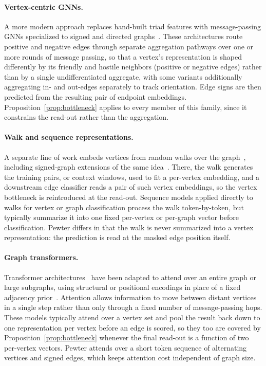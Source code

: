 \documentclass[sigconf]{acmart}
\theoremstyle{plain}
\theoremstyle{definition}
\begin{document}
\paragraph{Vertex-centric GNNs.}
\label{par:vertex-centric-gnns}
A more modern approach replaces hand-built triad features with message-passing GNNs specialized to signed and directed graphs~\citep{derr2018signed, huang2019signed, li2020learning, liu2021signed}. These architectures route positive and negative edges through separate aggregation pathways over one or more rounds of message passing, so that a vertex's representation is shaped differently by its friendly and hostile neighbors (positive or negative edges) rather than by a single undifferentiated aggregate, with some variants additionally aggregating in- and out-edges separately to track orientation. Edge signs are then predicted from the resulting pair of endpoint embeddings. Proposition~\ref{prop:bottleneck} applies to every member of this family, since it constrains the read-out rather than the aggregation.

\paragraph{Walk and sequence representations.} A separate line of work embeds vertices from random walks over the graph~\citep{perozzi2014deepwalk, grover2016node2vec}, including signed-graph extensions of the same idea~\citep{kim2018side, islam2018signet}. There, the walk generates the training pairs, or context windows, used to fit a per-vertex embedding, and a downstream edge classifier reads a pair of such vertex embeddings, so the vertex bottleneck is reintroduced at the read-out. Sequence models applied directly to walks for vertex or graph classification process the walk token-by-token, but typically summarize it into one fixed per-vertex or per-graph vector before classification. Pewter differs in that the walk is never summarized into a vertex representation: the prediction is read at the masked edge position itself.

\paragraph{Graph transformers.} Transformer architectures~\citep{vaswani2017attention} have been adapted to attend over an entire graph or large subgraphs, using structural or positional encodings in place of a fixed adjacency prior~\citep{dwivedi2021generalization, ying2021transformers, rampavsek2022recipe}. Attention allows information to move between distant vertices in a single step rather than only through a fixed number of message-passing hops. These models typically attend over a vertex set and pool the result back down to one representation per vertex before an edge is scored, so they too are covered by Proposition~\ref{prop:bottleneck} whenever the final read-out is a function of two per-vertex vectors. Pewter attends over a short token sequence of alternating vertices and signed edges, which keeps attention cost independent of graph size.
\end{document}

